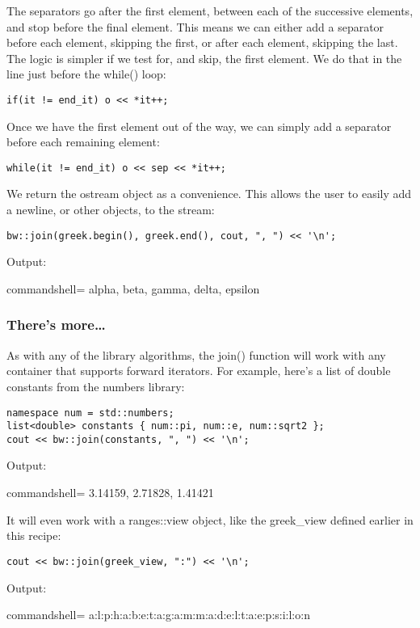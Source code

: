 The separators go after the first element, between each of the successive elements, and stop before the final element. This means we can either add a separator before each element, skipping the first, or after each element, skipping the last. The logic is simpler if we test for, and skip, the first element. We do that in the line just before the while() loop:

\begin{lstlisting}[style=styleCXX]
if(it != end_it) o << *it++;
\end{lstlisting}

Once we have the first element out of the way, we can simply add a separator before each remaining element:

\begin{lstlisting}[style=styleCXX]
while(it != end_it) o << sep << *it++;
\end{lstlisting}

We return the ostream object as a convenience. This allows the user to easily add a newline, or other objects, to the stream:

\begin{lstlisting}[style=styleCXX]
bw::join(greek.begin(), greek.end(), cout, ", ") << '\n';
\end{lstlisting}

Output:

\begin{tcblisting}{commandshell={}}
alpha, beta, gamma, delta, epsilon
\end{tcblisting}

\subsubsection{There's more…}

As with any of the library algorithms, the join() function will work with any container that supports forward iterators. For example, here's a list of double constants from the numbers library:

\begin{lstlisting}[style=styleCXX]
namespace num = std::numbers;
list<double> constants { num::pi, num::e, num::sqrt2 };
cout << bw::join(constants, ", ") << '\n';
\end{lstlisting}

Output:

\begin{tcblisting}{commandshell={}}
3.14159, 2.71828, 1.41421
\end{tcblisting}

It will even work with a ranges::view object, like the greek\_view defined earlier in this recipe:

\begin{lstlisting}[style=styleCXX]
cout << bw::join(greek_view, ":") << '\n';
\end{lstlisting}

Output:

\begin{tcblisting}{commandshell={}}
a:l:p:h:a:b:e:t:a:g:a:m:m:a:d:e:l:t:a:e:p:s:i:l:o:n
\end{tcblisting}

